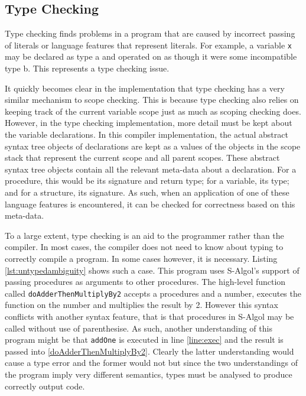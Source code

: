 \documentclass{article}
\begin{document}
\subsection{Type Checking}

Type checking finds problems in a program that are caused by incorrect passing of literals or language features that represent literals. For example, a variable \lstinline{x} may be declared as type a and operated on as though it were some incompatible type b. This represents a type checking issue.

It quickly becomes clear in the implementation that type checking has a very similar mechanism to scope checking. This is because type checking also relies on keeping track of the current variable scope just as much as scoping checking does. However, in the type checking implementation, more detail must be kept about the variable declarations. In this compiler implementation, the actual abstract syntax tree objects of declarations are kept as a values of the objects in the scope stack that represent the current scope and all parent scopes. These abstract syntax tree objects contain all the relevant meta-data about a declaration. For a procedure, this would be its signature and return type; for a variable, its type; and for a structure, its signature. As such, when an application of one of these language features is encountered, it can be checked for correctness based on this meta-data.

To a large extent, type checking is an aid to the programmer rather than the compiler. In most cases, the compiler does not need to know about typing to correctly compile a program. In some cases however, it is necessary. Listing \ref{lst:untypedambiguity} shows such a case. This program uses S-Algol's support of passing procedures as arguments to other procedures. The high-level function called \lstinline{doAdderThenMultiplyBy2} accepts a procedures and a number, executes the function on the number and multiplies the result by 2. However this syntax conflicts with another syntax feature, that is that procedures in S-Algol may be called without use of parenthesise. As such, another understanding of this program might be that \lstinline{addOne} is executed in line \ref{line:exec} and the result is passed into \ref{doAdderThenMultiplyBy2}. Clearly the latter understanding would cause a type error and the former would not but since the two understandings of the program imply very different semantics, types must be analysed to produce correctly output code.
\end{document}
